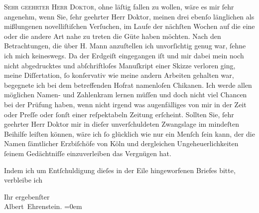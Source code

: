 \pstart{}\textsc{Sehr geehrter Herr Doktor,}\pend\vspace{0.5em}
\pstart
           ohne läſtig fallen zu wollen, wäre es mir ſehr angenehm, wenn Sie, ſehr geehrter Herr
               Doktor, meinen drei ebenſo länglichen als mißlungenen novelliſtiſchen Verſuchen, im Laufe
               der nächſten Wochen auf die eine oder die andere Art nahe zu treten die Güte haben
               möchten. Nach den Betrachtungen, die über H.
                  Mann anzuſtellen ich unvorſichtig genug war, ſehne ich mich keineswegs. Da
                  {\pb}der Erdgeiſt eingegangen iſt und mir dabei mein noch nicht abgedrucktes und
               abſchriftloſes Manuſkript einer Skizze verloren ging, meine Diſſertation, ſo konſervativ wie meine
               andern Arbeiten gehalten war, begegnete ich bei dem betreffenden Hofrat namenloſen Chikanen. Ich werde allen
               möglichen Namen- und Zahlenkram lernen müſſen und doch nicht viel Chancen bei der
               Prüfung haben, wenn nicht irgend was augenfälliges von mir in der Zeit oder Preſſe oder ſonſt
               einer reſpektabeln Zeitung erſcheint. Sollten Sie, {\pb}ſehr geehrter Herr Doktor mir in dieſer
               unverſchuldeten Zwangslage im mindeſten Beihilfe leiſten können, wäre ich ſo
               glücklich wie nur ein Menſch ſein kann, der die Namen ſämtlicher Erzbiſchöfe von Köln und dergleichen Ungeheuerlichkeiten ſeinem
               Gedächtniſſe einzuverleiben das Vergnügen hat.\pend
           
\pstart
           Indem ich um Entſchuldigung dieſes in der Eile hingeworfenen Briefes bitte, verbleibe
               ich\pend
           
\pstart
           Ihr ergebenſter{\\[\baselineskip]}\spacefill\mbox{Albert Ehrenstein.}\pend
           \leftskip=0em{}\endnumbering{}  
      